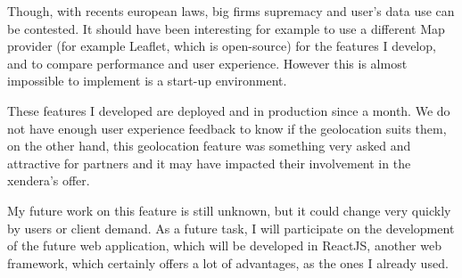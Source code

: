 \documentclass{article}
\begin{document}
            \vspace{1cm}

            Though, with recents european laws, big firms supremacy and user's data use can be contested. It should have been interesting for example to
            use a different Map provider (for example Leaflet, which is open-source) for the features I develop, and to compare performance and user experience.
            However this is almost impossible to implement is a start-up environment.

            \vspace{1cm}
            
            These features I developed are deployed and in production since a month. We do not have enough user experience feedback to know if the
            geolocation suits them, on the other hand, this geolocation feature was something very asked and attractive for partners and it may have impacted their involvement
            in the xendera's offer.
            
            \vspace{1cm}

            My future work on this feature is still unknown, but it could change very quickly by users or client demand. As a future task, I will
            participate on the development of the future web application, which will be developed in ReactJS, another web framework, which certainly
            offers a lot of advantages, as the ones I already used.
            
        \newpage
\end{document}
